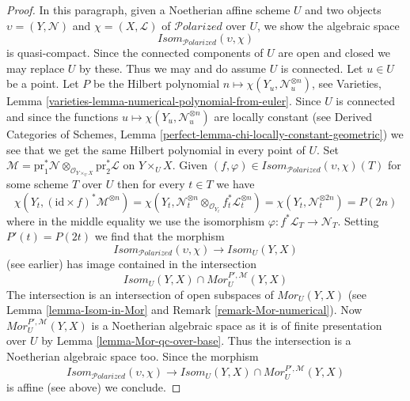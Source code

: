 \documentclass[10pt,a4paper]{amsart}
\theoremstyle{plain}
\theoremstyle{definition}
\theoremstyle{remark}
\numberwithin{equation}{subsection}
\def\Polarizedstack{\mathcal{P}\!\mathit{olarized}}
\begin{document}
\begin{proof}
\medskip\noindent
In this paragraph, given a Noetherian affine scheme $U$ and two objects
$\upsilon = (Y, \mathcal{N})$ and $\chi = (X, \mathcal{L})$
of $\Polarizedstack$ over $U$, we show the algebraic space
$$
\mathit{Isom}_{\Polarizedstack}(\upsilon, \chi)
$$
is quasi-compact. Since the connected components of $U$ are open and closed
we may replace $U$ by these. Thus we may and do assume $U$ is connected.
Let $u \in U$ be a point. Let $P$ be the Hilbert polynomial
$n \mapsto \chi(Y_u, \mathcal{N}_u^{\otimes n})$, see
Varieties, Lemma \ref{varieties-lemma-numerical-polynomial-from-euler}.
Since $U$ is connected and since
the functions $u \mapsto \chi(Y_u, \mathcal{N}_u^{\otimes n})$
are locally constant (see 
Derived Categories of Schemes, Lemma
\ref{perfect-lemma-chi-locally-constant-geometric})
we see that we get the same Hilbert polynomial in every point of $U$.
Set
$\mathcal{M} = \text{pr}_1^*\mathcal{N}
\otimes_{\mathcal{O}_{Y \times_U X}} \text{pr}_2^*\mathcal{L}$
on $Y \times_U X$. Given
$(f, \varphi) \in \mathit{Isom}_{\Polarizedstack}(\upsilon, \chi)(T)$
for some scheme $T$ over $U$ then for every $t \in T$ we have
$$
\chi(Y_t, (\text{id} \times f)^*\mathcal{M}^{\otimes n}) =
\chi(Y_t,
\mathcal{N}_t^{\otimes n} \otimes_{\mathcal{O}_{Y_t}}
f_t^*\mathcal{L}_t^{\otimes n}) =
\chi(Y_t, \mathcal{N}_t^{\otimes 2n}) = P(2n)
$$
where in the middle equality we use the isomorphism
$\varphi : f^*\mathcal{L}_T \to \mathcal{N}_T$.
Setting $P'(t) = P(2t)$ we find that the morphism
$$
\mathit{Isom}_{\Polarizedstack}(\upsilon, \chi)
\longrightarrow
\mathit{Isom}_U(Y, X)
$$
(see earlier) has image contained in the intersection
$$
\mathit{Isom}_U(Y, X) \cap \mathit{Mor}^{P', \mathcal{M}}_U(Y, X)
$$
The intersection is an intersection of open subspaces of
$\mathit{Mor}_U(Y, X)$ (see Lemma \ref{lemma-Isom-in-Mor} and
Remark \ref{remark-Mor-numerical}).
Now $\mathit{Mor}^{P', \mathcal{M}}_U(Y, X)$
is a Noetherian algebraic space as it is of finite
presentation over $U$ by Lemma \ref{lemma-Mor-qc-over-base}.
Thus the intersection
is a Noetherian algebraic space too. Since the morphism
$$
\mathit{Isom}_{\Polarizedstack}(\upsilon, \chi)
\longrightarrow
\mathit{Isom}_U(Y, X) \cap \mathit{Mor}^{P', \mathcal{M}}_U(Y, X)
$$
is affine (see above) we conclude.
\end{proof}



\end{document}
